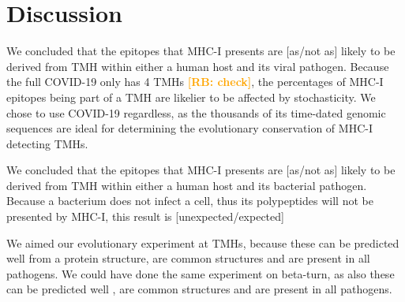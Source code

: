 \documentclass{article}
\newcommand{\frans}[1]{\textcolor{blue}{\textbf{[FB: #1]}}}
\newcommand{\richel}[1]{\textcolor{orange}{\textbf{[RB: #1]}}}
\begin{document}


\section{Discussion}

We concluded that the
epitopes that MHC-I presents are [as/not as] likely 
to be derived from TMH within either a human host and its viral pathogen.
Because the full COVID-19 only has 4 TMHs \richel{check}, the percentages
of MHC-I epitopes being part of a TMH are likelier to be affected by
stochasticity. We chose to use COVID-19 regardless, as the thousands
of its time-dated genomic sequences are ideal for determining the 
evolutionary conservation of MHC-I detecting TMHs. 

We concluded that the
epitopes that MHC-I presents are [as/not as] likely 
to be derived from TMH within either a human host and its bacterial pathogen.
Because a bacterium does not infect a cell, thus its polypeptides
will not be presented by MHC-I, this result is [unexpected/expected]

We aimed our evolutionary experiment at TMHs, because these can
be predicted well from a protein structure,
are common structures and are present in all pathogens. 
We could have done the same experiment on beta-turn,
as also these can be predicted well \cite{petersen2010netturnp},
are common structures and are present in all pathogens.

\end{document}
